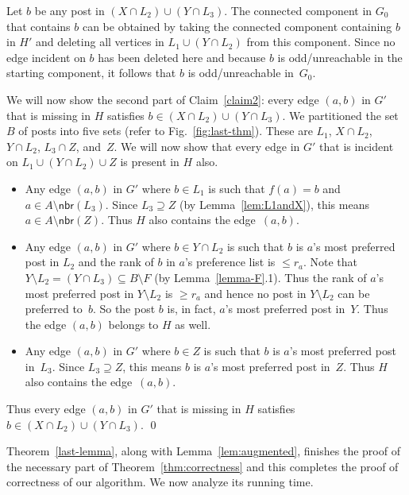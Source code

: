 \documentclass[11pt]{llncs}
\newcommand{\Nbr}{\mathsf{nbr}}
\begin{document}
Let $b$ be any post in $(X \cap L_2) \cup (Y \cap L_3)$. The connected component in $G_0$ that 
contains $b$ can be obtained by taking the connected component containing $b$ in $H'$ and 
deleting all vertices in $L_1 \cup (Y \cap L_2)$ from this component. Since no edge incident on 
$b$ has been deleted here and because $b$ is odd/unreachable in the starting component, it 
follows that $b$ is odd/unreachable in~$G_0$.

\smallskip

We will now show the second part of Claim~\ref{claim2}: every edge $(a,b)$ in $G'$ that is 
missing in $H$ satisfies $b \in (X \cap L_2) \cup (Y \cap L_3)$.
We partitioned the set $B$ of posts into five sets (refer to Fig.~\ref{fig:last-thm}). These are 
$L_1$, $X \cap L_2$, $Y \cap L_2$, $L_3 \cap Z$, and~$Z$. We will now show that every 
edge in $G'$ that is incident on $L_1 \cup (Y \cap L_2) \cup Z$ is present in $H$ also.
\begin{itemize}
\item Any edge $(a,b)$ in $G'$ where $b \in L_1$ is such that $f(a) = b$ and $a \in A \setminus \Nbr(L_3)$.
Since $L_3 \supseteq Z$ (by Lemma~\ref{lem:L1andX}), this means $a \in  A \setminus \Nbr(Z)$. Thus $H$ also contains the edge~$(a,b)$.
\item Any edge $(a,b)$ in $G'$ where $b \in Y \cap L_2$ is such that $b$ is $a$'s most preferred post in $L_2$ and
the rank of $b$ in $a$'s preference list is $\le r_a$. Note that $Y \setminus L_2 = (Y \cap L_3) \subseteq B\setminus F$ 
(by Lemma~\ref{lemma-F}.1). Thus the rank of $a$'s most preferred post in $Y \setminus L_2$ is $\ge r_a$ and hence no post in 
$Y \setminus L_2$ can be preferred to~$b$. So the post $b$ is, in fact, $a$'s most preferred post in~$Y$. Thus the edge $(a,b)$ 
belongs to $H$ as well. 
\item Any edge $(a,b)$ in $G'$ where $b \in Z$ is such that $b$ is $a$'s most preferred post in~$L_3$.
Since $L_3 \supseteq Z$, this means $b$ is $a$'s most preferred post in~$Z$. Thus $H$ also contains the edge~$(a,b)$. 
\end{itemize}
Thus every edge $(a,b)$ in $G'$ that is missing in $H$ satisfies 
$b \in (X \cap L_2) \cup (Y \cap L_3)$. \qed

\medskip

Theorem~\ref{last-lemma}, along with Lemma~\ref{lem:augmented}, finishes the proof of the 
necessary part of Theorem~\ref{thm:correctness} and this completes 
the proof of correctness of our algorithm. We now analyze its running time.
\end{document}
